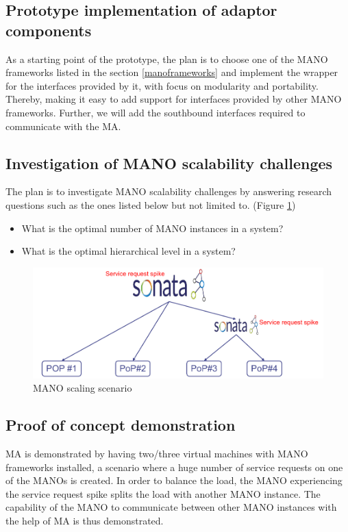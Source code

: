 \subsection{Prototype implementation of adaptor components}

As a starting point of the prototype, the plan is to choose one of the MANO frameworks listed in the section \ref{manoframeworks} and implement the wrapper for the interfaces provided by it, with focus on modularity and portability. Thereby, making it easy to add support for interfaces provided by other MANO frameworks. Further, we will add the southbound interfaces required to communicate with the MA.

\subsection{Investigation of MANO scalability challenges}
\label{wp3manoresearch}
The plan is to investigate MANO scalability challenges by answering research questions such as the ones listed below but not limited to. (Figure \ref{fig:wp3manoscale})
\begin{itemize}
	\item What is the optimal number of MANO instances in a system?
	\item What is the optimal hierarchical level in a system?
\end{itemize}

\begin{figure}[h]
	\centering
	\includegraphics[width=0.9\linewidth]{figures/wp3manoScale}
	\caption{MANO scaling scenario \cite{WPDescriptionsPDF}}
	\label{fig:wp3manoscale}
\end{figure}


\subsection{Proof of concept demonstration}
MA is demonstrated by having two/three virtual machines with MANO frameworks installed, a scenario where a huge number of service requests on one of the MANOs is created. In order to balance the load, the MANO experiencing the service request spike splits the load with another MANO instance. The capability of the MANO to communicate between other MANO instances with the help of MA is thus demonstrated.

